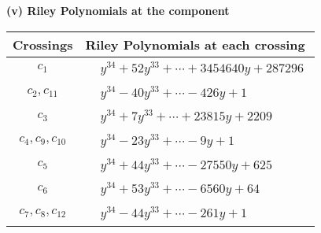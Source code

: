 \documentclass[1p]{elsarticle_modified}
\theoremstyle{definition}
\begin{document}
\flushleft \textbf{(v) Riley Polynomials at the component}\newline \\
\begin{tabular}{m{50pt}|m{274pt}}
Crossings & \hspace{64pt}Riley Polynomials at each crossing \\
\hline $$\begin{aligned}c_{1}\end{aligned}$$&$\begin{aligned}
&y^{34}+52 y^{33}+\cdots+3454640 y+287296
\end{aligned}$\\
\hline $$\begin{aligned}c_{2},c_{11}\end{aligned}$$&$\begin{aligned}
&y^{34}-40 y^{33}+\cdots-426 y+1
\end{aligned}$\\
\hline $$\begin{aligned}c_{3}\end{aligned}$$&$\begin{aligned}
&y^{34}+7 y^{33}+\cdots+23815 y+2209
\end{aligned}$\\
\hline $$\begin{aligned}c_{4},c_{9},c_{10}\end{aligned}$$&$\begin{aligned}
&y^{34}-23 y^{33}+\cdots-9 y+1
\end{aligned}$\\
\hline $$\begin{aligned}c_{5}\end{aligned}$$&$\begin{aligned}
&y^{34}+44 y^{33}+\cdots-27550 y+625
\end{aligned}$\\
\hline $$\begin{aligned}c_{6}\end{aligned}$$&$\begin{aligned}
&y^{34}+53 y^{33}+\cdots-6560 y+64
\end{aligned}$\\
\hline $$\begin{aligned}c_{7},c_{8},c_{12}\end{aligned}$$&$\begin{aligned}
&y^{34}-44 y^{33}+\cdots-261 y+1
\end{aligned}$\\
\hline
\end{tabular}\\~\\
\end{document}
